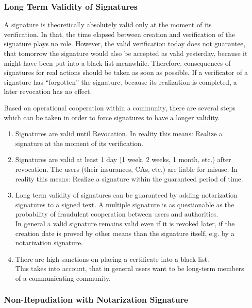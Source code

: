 \subsubsection{Long Term Validity of Signatures}
\label{ops-ltv}

A signature is
theoretically absolutely valid only at the moment of its verification.
In that, the time elapsed between creation
and verification of the signature plays no role.
However, the valid verification today does not guarantee,
that tomorrow the signature would also be accepted as valid yesterday,
because it might have been put into a black list meanwhile.
Therefore, consequences of signatures for real actions should be taken
as soon as possible.
If a verificator of a signature has ``forgotten'' the signature,
because its realization is completed,
a later revocation has no effect.

Based on operational cooperation within a community,
there are several steps which can be taken in order to force
signatures to have a longer validity.

\begin{enumerate}
\item Signatures are valid until Revocation.
In reality this means: Realize a signature at the moment of its verification.
\item Signatures are valid at least 1 day (1 week, 2 weeks, 1 month, etc.)
after revocation.
The users (their insurances, CAs, etc.) are liable for misuse.
In reality this means: Realize a signature within the guaranteed
period of time.
\item Long term validity of signatures can be guaranteed by adding
notarization signatures to a signed text.
A multiple signature is as questionable as the probability
of fraudulent cooperation between users and authorities.
\\
In general a valid signature remains valid even if it is revoked later,
if the creation date is proved by other means than the signature itself,
e.g. by a notarization signature.
\item There are high sanctions on placing a certificate into a black list.
\\
This takes into account, that in general users want to be long-term
members of a communicating community.
\end{enumerate}

\subsubsection{Non-Repudiation with Notarization Signature}
\label{ops-not}

